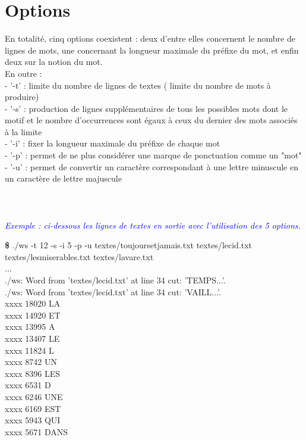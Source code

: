 \documentclass[12pt, letterpaper]{report}
\begin{document}
\section{Options}
En totalité, cinq options coexistent : deux d'entre elles concernent 
le nombre de lignes de mots, une concernant la longueur maximale du 
préfixe du mot, et enfin deux sur la notion du mot.
\\En outre : 
\\- '-t' : limite du nombre de lignes de textes ( limite du nombre de 
mots à produire)
\\- '-s' : production de lignes supplémentaires de tous les possibles mots
dont le motif et le nombre d'occurrences sont égaux à ceux du dernier 
des mots associés à la limite
\\- '-i' : fixer la longueur maximale du préfixe de chaque mot
\\- '-p' : permet de ne plus considérer 
une marque de ponctuation comme un "mot"
\\- '-u' : permet de convertir un caractère correspondant à une lettre 
minuscule en un caractère de lettre majuscule
\\ \\ \\ \\

\textcolor{blue}{
\emph{Exemple : ci-dessous les lignes de textes en sortie avec 
l'utilisation des 5 options.} }

\noindent \textbf{\$} ./ws -t 12 -s -i 5 -p -u textes/toujoursetjamais.txt  textes/lecid.txt textes/lesmiserables.txt textes/lavare.txt
\\...
\\./ws: Word from 'textes/lecid.txt' at line 34 cut: 'TEMPS...'.
\\./ws: Word from 'textes/lecid.txt' at line 34 cut: 'VAILL...'.
\\xxxx    18020   LA
\\xxxx    14920   ET
\\xxxx    13995   A
\\xxxx    13407   LE
\\xxxx    11824   L
\\xxxx    8742    UN
\\xxxx    8396    LES
\\xxxx    6531    D
\\xxxx    6246    UNE
\\xxxx    6169    EST
\\xxxx    5943    QUI
\\xxxx    5671    DANS
\end{document}
